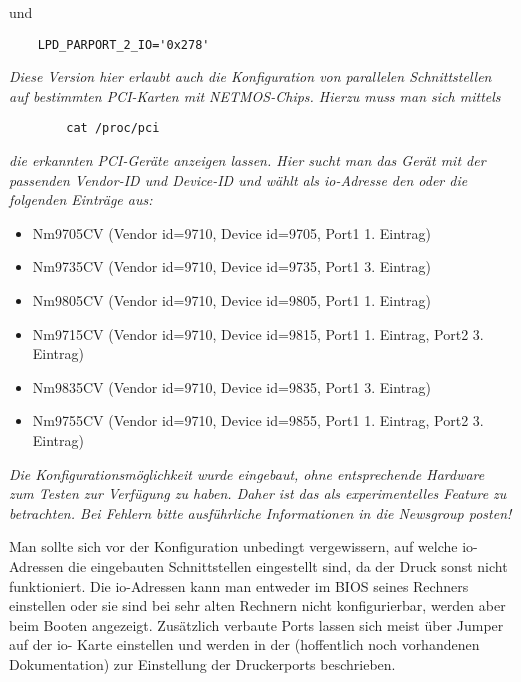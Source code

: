 \begin{description}
    und

\begin{example}
\begin{verbatim}
    LPD_PARPORT_2_IO='0x278'
\end{verbatim}
\end{example}


    \emph{Diese Version hier erlaubt auch die Konfiguration von parallelen
    Schnittstellen auf bestimmten PCI-Karten mit NETMOS-Chips.
    Hierzu muss man sich mittels}

\begin{example}
\begin{verbatim}
        cat /proc/pci
\end{verbatim}
\end{example}
    \emph{die erkannten PCI-Geräte anzeigen lassen. Hier sucht man das Gerät mit
    der passenden Vendor-ID und Device-ID und wählt als io-Adresse den oder
    die folgenden Einträge aus:}

        \begin{itemize}
        \item Nm9705CV  (Vendor id=9710, Device id=9705, Port1 1. Eintrag)
        \item Nm9735CV  (Vendor id=9710, Device id=9735, Port1 3. Eintrag)
        \item Nm9805CV  (Vendor id=9710, Device id=9805, Port1 1. Eintrag)
        \item Nm9715CV  (Vendor id=9710, Device id=9815, Port1 1. Eintrag, Port2 3. Eintrag)
        \item Nm9835CV  (Vendor id=9710, Device id=9835, Port1 3. Eintrag)
        \item Nm9755CV  (Vendor id=9710, Device id=9855, Port1 1. Eintrag, Port2 3. Eintrag)
        \end{itemize}

    \emph{Die Konfigurationsmöglichkeit wurde eingebaut, ohne entsprechende
    Hardware zum Testen zur Verfügung zu haben. Daher ist das als
    experimentelles Feature zu betrachten. Bei Fehlern bitte ausführliche
    Informationen in die Newsgroup posten!}

    Man sollte sich vor der Konfiguration unbedingt vergewissern, auf
    welche io-Adressen die eingebauten Schnittstellen eingestellt sind, da
    der Druck sonst nicht funktioniert. Die io-Adressen kann man entweder
    im BIOS seines Rechners einstellen oder sie sind bei sehr alten
    Rechnern nicht konfigurierbar, werden aber beim Booten angezeigt.
    Zusätzlich verbaute Ports lassen sich meist über Jumper auf der io-
    Karte einstellen und werden in der (hoffentlich noch vorhandenen
    Dokumentation) zur Einstellung der Druckerports beschrieben.


\end{description}

